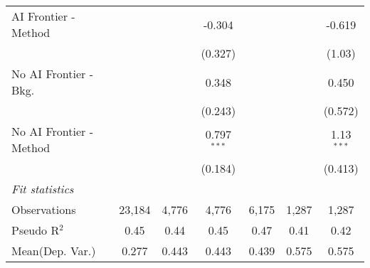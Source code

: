 \begin{tabular}{lcccccc}
   AI Frontier - Method    &               &               & -0.304        &             &             & -0.619\\   
                           &               &               & (0.327)       &             &             & (1.03)\\   
   No AI Frontier - Bkg.   &               &               & 0.348         &             &             & 0.450\\   
                           &               &               & (0.243)       &             &             & (0.572)\\   
   No AI Frontier - Method &               &               & 0.797$^{***}$ &             &             & 1.13$^{***}$\\   
                           &               &               & (0.184)       &             &             & (0.413)\\   
   \midrule
   \emph{Fit statistics}\\
   Observations            & 23,184        & 4,776         & 4,776         & 6,175       & 1,287       & 1,287\\  
   Pseudo R$^2$            & 0.45          & 0.44          & 0.45          & 0.47        & 0.41        & 0.42\\  
Mean(Dep. Var.) & 0.277 & 0.443 & 0.443 & 0.439 & 0.575 & 0.575 \\
   

\end{tabular}
